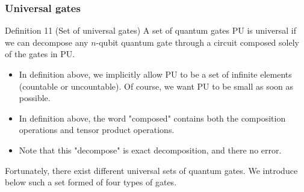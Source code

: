 \subsubsection{Universal gates }

\begin{definition}
    Definition 11 (Set of universal gates) A set of quantum gates PU is universal if we can decompose any $n$-qubit quantum gate through a circuit composed solely of the gates in PU.
\end{definition}

\begin{remark}
\begin{itemize}
    \item In definition above, we implicitly allow PU to be a set of infinite elements (countable or uncountable). Of course, we want PU to be small as soon as possible.
    \item In definition above, the word "composed" contains both the composition operations and tensor product operations.
    \item Note that this "decompose" is exact decomposition, and there no error.
\end{itemize}
\end{remark}

Fortunately, there exist different universal sets of quantum gates. We introduce below such a set formed of four types of gates. 

